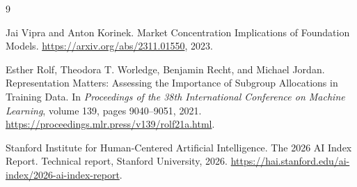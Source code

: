 \documentclass{article}
\begin{document}
\begin{thebibliography}{9}

Jai Vipra and Anton Korinek.
\newblock Market Concentration Implications of Foundation Models.
\newblock \url{https://arxiv.org/abs/2311.01550}, 2023.

Esther Rolf, Theodora T. Worledge, Benjamin Recht, and Michael Jordan.
\newblock Representation Matters: Assessing the Importance of Subgroup
Allocations in Training Data.
\newblock In \emph{Proceedings of the 38th International Conference on Machine
Learning}, volume 139, pages 9040--9051, 2021.
\newblock \url{https://proceedings.mlr.press/v139/rolf21a.html}.

Stanford Institute for Human-Centered Artificial Intelligence.
\newblock The 2026 AI Index Report.
\newblock Technical report, Stanford University, 2026.
\newblock \url{https://hai.stanford.edu/ai-index/2026-ai-index-report}.

\end{thebibliography}
\end{document}
